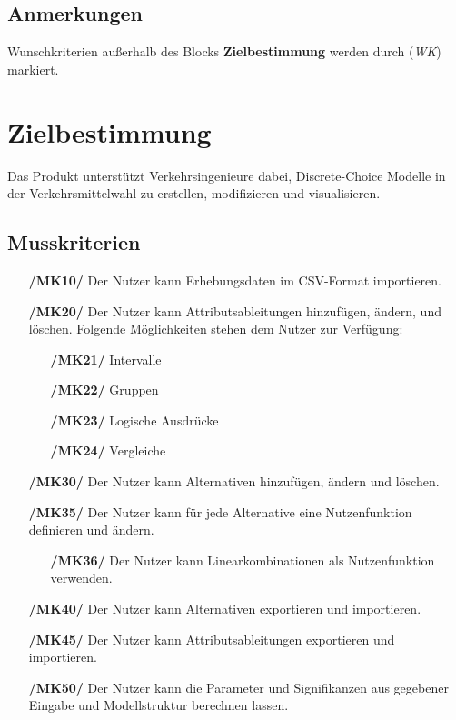 \documentclass{article}
\begin{document}
\subsection{Anmerkungen}
Wunschkriterien außerhalb des Blocks \textbf{Zielbestimmung} werden durch (\textit{WK}) markiert.

\clearpage
\section{Zielbestimmung}
Das Produkt unterstützt Verkehrsingenieure dabei, Discrete-Choice Modelle in der Verkehrsmittelwahl zu erstellen, modifizieren und visualisieren.
\subsection{Musskriterien}
\begin{itemize}
    \item[\textbf{/MK10/}] Der Nutzer kann Erhebungsdaten im CSV-Format importieren.
    \item[\textbf{/MK20/}] Der Nutzer kann Attributsableitungen hinzufügen, ändern, und löschen.
    \newline Folgende Möglichkeiten stehen dem Nutzer zur Verfügung:
    \begin{itemize}[leftmargin=.7in]
        \item[\textbf{/MK21/}] Intervalle
        \item[\textbf{/MK22/}] Gruppen
        \item[\textbf{/MK23/}] Logische Ausdrücke
        \item[\textbf{/MK24/}] Vergleiche
    \end{itemize}
    \item[\textbf{/MK30/}] Der Nutzer kann Alternativen hinzufügen, ändern und löschen.
    \item[\textbf{/MK35/}] Der Nutzer kann für jede Alternative eine Nutzenfunktion definieren und ändern.
    \begin{itemize}[leftmargin=.7in]
        \item[\textbf{/MK36/}] Der Nutzer kann Linearkombinationen als Nutzenfunktion verwenden.
    \end{itemize}
    \item[\textbf{/MK40/}] Der Nutzer kann Alternativen exportieren und importieren.
    \item[\textbf{/MK45/}] Der Nutzer kann Attributsableitungen exportieren und importieren. 
    \item[\textbf{/MK50/}] Der Nutzer kann die Parameter und Signifikanzen aus gegebener Eingabe und Modellstruktur berechnen lassen.

\end{itemize}
\end{document}
